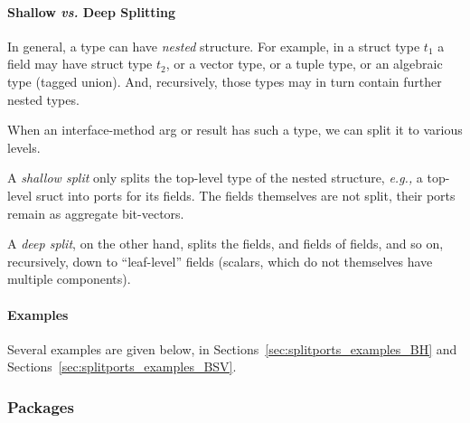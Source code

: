 
\paragraph{Shallow \emph{vs.} Deep Splitting}



\hspace*{1em}

In general, a type can have \emph{nested} structure.  For example, in
a struct type $t_1$ a field may have struct type $t_2$, or a vector
type, or a tuple type, or an algebraic type (tagged union).  And,
recursively, those types may in turn contain further nested types.

When an interface-method arg or result has such a type, we can split
it to various levels.

A \emph{shallow split} only splits the top-level type of the nested
structure, \emph{e.g.,} a top-level sruct into ports for its fields.
The fields themselves are not split, their ports remain as aggregate
bit-vectors.

A \emph{deep split}, on the other hand, splits the fields, and fields
of fields, and so on, recursively, down to ``leaf-level'' fields
(scalars, which do not themselves have multiple components).


\paragraph{Examples}

\hspace*{1em}

Several examples are given below, in
Sections~\ref{sec:splitports_examples_BH}
and
Sections~\ref{sec:splitports_examples_BSV}.


\subsubsection{Packages} 

